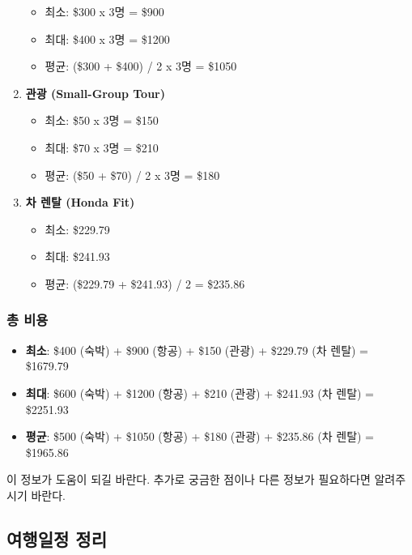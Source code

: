 \documentclass[
  letterpaper,
]{book}
\providecommand{\tightlist}{%
  \setlength{\itemsep}{0pt}\setlength{\parskip}{0pt}}\usepackage{longtable,booktabs,array}
\begin{document}
\begin{tcolorbox}
\begin{enumerate}
  \begin{itemize}
  \tightlist
  \item
    최소: \$300 x 3명 = \$900
  \item
    최대: \$400 x 3명 = \$1200
  \item
    평균: (\$300 + \$400) / 2 x 3명 = \$1050
  \end{itemize}
\item
  \textbf{관광 (Small-Group Tour)}

  \begin{itemize}
  \tightlist
  \item
    최소: \$50 x 3명 = \$150
  \item
    최대: \$70 x 3명 = \$210
  \item
    평균: (\$50 + \$70) / 2 x 3명 = \$180
  \end{itemize}
\item
  \textbf{차 렌탈 (Honda Fit)}

  \begin{itemize}
  \tightlist
  \item
    최소: \$229.79
  \item
    최대: \$241.93
  \item
    평균: (\$229.79 + \$241.93) / 2 = \$235.86
  \end{itemize}
\end{enumerate}

\hypertarget{uxcd1d-uxbe44uxc6a9}{%
\subsubsection*{총 비용}\label{uxcd1d-uxbe44uxc6a9}}

\begin{itemize}
\tightlist
\item
  \textbf{최소}: \$400 (숙박) + \$900 (항공) + \$150 (관광) + \$229.79
  (차 렌탈) = \$1679.79
\item
  \textbf{최대}: \$600 (숙박) + \$1200 (항공) + \$210 (관광) + \$241.93
  (차 렌탈) = \$2251.93
\item
  \textbf{평균}: \$500 (숙박) + \$1050 (항공) + \$180 (관광) + \$235.86
  (차 렌탈) = \$1965.86
\end{itemize}

이 정보가 도움이 되길 바란다. 추가로 궁금한 점이나 다른 정보가
필요하다면 알려주시기 바란다.

\end{tcolorbox}

\hypertarget{uxc5ecuxd589uxc77cuxc815-uxc815uxb9ac}{%
\subsection{여행일정 정리}\label{uxc5ecuxd589uxc77cuxc815-uxc815uxb9ac}}
\end{document}
